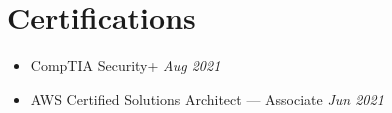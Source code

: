 \documentclass[a4paper,11pt]{article}
\newcommand{\resumeItem}[2]{
  \item\small{
    \textbf{#1}{: #2 \vspace{-2pt}}
  }
}
\newcommand{\resumeSubItem}[2]{\resumeItem{#1}{#2}\vspace{-4pt}}
\newcommand{\resumeSubHeadingListStart}{\begin{itemize}[leftmargin=*]}
\newcommand{\resumeSubHeadingListEnd}{\end{itemize}}
\begin{document}
\section{Certifications}
\begin{itemize}
    \item {\small CompTIA Security+ \hfill \textit{Aug 2021}} \vspace{-8pt}
    \item {\small AWS Certified Solutions Architect --- Associate \hfill
            \textit{Jun 2021}} \vspace{-8pt}
\end{itemize}


\end{document}
